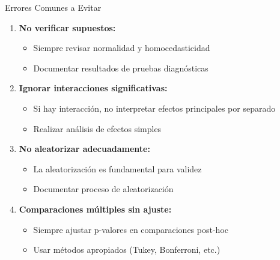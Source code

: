 \documentclass[aspectratio=169]{beamer}
\begin{document}
\begin{frame}{Errores Comunes a Evitar}
\begin{enumerate}
\item \textbf{No verificar supuestos:}
\begin{itemize}
\item Siempre revisar normalidad y homocedasticidad
\item Documentar resultados de pruebas diagnósticas
\end{itemize}

\vspace{0.2cm}

\item \textbf{Ignorar interacciones significativas:}
\begin{itemize}
\item Si hay interacción, no interpretar efectos principales por separado
\item Realizar análisis de efectos simples
\end{itemize}

\vspace{0.2cm}

\item \textbf{No aleatorizar adecuadamente:}
\begin{itemize}
\item La aleatorización es fundamental para validez
\item Documentar proceso de aleatorización
\end{itemize}

\vspace{0.2cm}

\item \textbf{Comparaciones múltiples sin ajuste:}
\begin{itemize}
\item Siempre ajustar p-valores en comparaciones post-hoc
\item Usar métodos apropiados (Tukey, Bonferroni, etc.)
\end{itemize}
\end{enumerate}
\end{frame}
\end{document}
